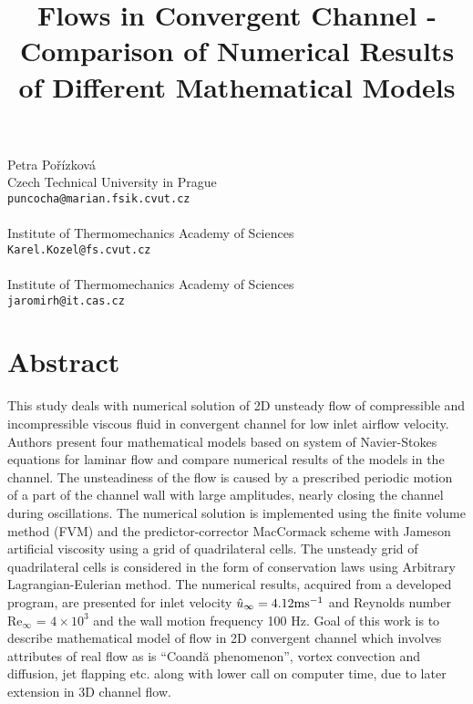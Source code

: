 \title{Flows in Convergent Channel - Comparison of Numerical Results of Different Mathematical Models}
 \author{} \institute{}
\maketitle
\begin{center}
{\large Petra Po\v{r}\'izkov\'a}\\
Czech Technical University in Prague\\
{\tt puncocha@marian.fsik.cvut.cz}
\\ \vspace{4mm}{\large Karel Kozel}\\
Institute of Thermomechanics Academy of Sciences\\
{\tt Karel.Kozel@fs.cvut.cz}
\\ \\
Institute of Thermomechanics Academy of Sciences\\
{\tt jaromirh@it.cas.cz}

\end{center}

\section*{Abstract}

This study deals with numerical solution of 2D unsteady flow of compressible and incompressible viscous fluid in convergent channel for low inlet airflow velocity. Authors present four mathematical models based on system of Navier-Stokes equations for laminar flow and compare numerical results of the models in the channel.
The unsteadiness of the flow is caused by a prescribed periodic motion of a part of the channel wall with large amplitudes, nearly closing the channel during oscillations.
The numerical solution is implemented using the finite volume method (FVM) and the predictor-corrector MacCormack scheme with Jameson artificial viscosity using a grid of quadrilateral cells. The unsteady grid of quadrilateral cells is considered in the form of conservation laws using Arbitrary Lagrangian-Eulerian method.
The numerical results, acquired from a developed program, are presented for inlet velocity $\hat u_{\infty}=4.12 {\rm ms^{-1}}$ and Reynolds number Re$_{\infty}$ = $4 \times 10^3$ and the wall motion frequency 100 Hz.
Goal of this work is to describe mathematical model of flow in 2D convergent channel which involves attributes of real flow as is ``Coand\u{a} phenomenon'', vortex convection and diffusion, jet flapping etc. along with lower call on computer time, due to later extension in 3D channel flow. 

